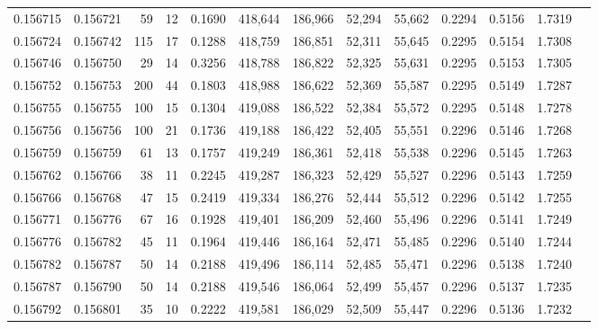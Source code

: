 \begin{tabular}{rrrrrrrrrrrrr}
0.156715 & 0.156721 &    59 &  12 &                                     0.1690 & 418,644 & 186,966 &  52,294 &  55,662 & 0.2294 & 0.5156 & 1.7319 \\
0.156724 & 0.156742 &   115 &  17 &                                     0.1288 & 418,759 & 186,851 &  52,311 &  55,645 & 0.2295 & 0.5154 & 1.7308 \\
0.156746 & 0.156750 &    29 &  14 &                                     0.3256 & 418,788 & 186,822 &  52,325 &  55,631 & 0.2295 & 0.5153 & 1.7305 \\
0.156752 & 0.156753 &   200 &  44 &                                     0.1803 & 418,988 & 186,622 &  52,369 &  55,587 & 0.2295 & 0.5149 & 1.7287 \\
0.156755 & 0.156755 &   100 &  15 &                                     0.1304 & 419,088 & 186,522 &  52,384 &  55,572 & 0.2295 & 0.5148 & 1.7278 \\
0.156756 & 0.156756 &   100 &  21 &                                     0.1736 & 419,188 & 186,422 &  52,405 &  55,551 & 0.2296 & 0.5146 & 1.7268 \\
0.156759 & 0.156759 &    61 &  13 &                                     0.1757 & 419,249 & 186,361 &  52,418 &  55,538 & 0.2296 & 0.5145 & 1.7263 \\
0.156762 & 0.156766 &    38 &  11 &                                     0.2245 & 419,287 & 186,323 &  52,429 &  55,527 & 0.2296 & 0.5143 & 1.7259 \\
0.156766 & 0.156768 &    47 &  15 &                                     0.2419 & 419,334 & 186,276 &  52,444 &  55,512 & 0.2296 & 0.5142 & 1.7255 \\
0.156771 & 0.156776 &    67 &  16 &                                     0.1928 & 419,401 & 186,209 &  52,460 &  55,496 & 0.2296 & 0.5141 & 1.7249 \\
0.156776 & 0.156782 &    45 &  11 &                                     0.1964 & 419,446 & 186,164 &  52,471 &  55,485 & 0.2296 & 0.5140 & 1.7244 \\
0.156782 & 0.156787 &    50 &  14 &                                     0.2188 & 419,496 & 186,114 &  52,485 &  55,471 & 0.2296 & 0.5138 & 1.7240 \\
0.156787 & 0.156790 &    50 &  14 &                                     0.2188 & 419,546 & 186,064 &  52,499 &  55,457 & 0.2296 & 0.5137 & 1.7235 \\
0.156792 & 0.156801 &    35 &  10 &                                     0.2222 & 419,581 & 186,029 &  52,509 &  55,447 & 0.2296 & 0.5136 & 1.7232 \\

\end{tabular}
